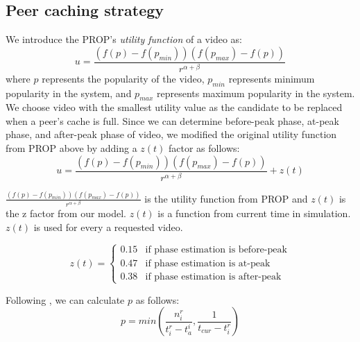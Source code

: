 \documentclass[10pt,final,journal,a4paper]{IEEEtran}
\begin{document}
\subsection{Peer caching strategy}\label{peercachingstrategy}
We introduce the PROP's \textit{utility function} of a video as:
\begin{equation}
u = \frac{ (f(p) - f(p_{min})) (f(p_{max}) - f(p)) }{r^{\alpha + \beta}} 
\end{equation}
where $p$ represents the popularity of the video, $p_{min}$ represents minimum popularity in the system, and $p_{max}$ represents maximum popularity in the system.
We choose video with the smallest utility value as the candidate to be replaced when a peer's cache is full.
Since we can determine before-peak phase, at-peak phase, and after-peak phase of video, we modified the original utility function from PROP above by adding a $z(t)$ factor as follows:
\begin{equation}
u = \frac{ (f(p) - f(p_{min})) (f(p_{max}) - f(p)) }{r^{\alpha + \beta}} + z(t)
\end{equation}

$\frac{ (f(p) - f(p_{min})) (f(p_{max}) - f(p)) }{r^{\alpha + \beta}}$ is the utility function from PROP and $z(t)$ is the z factor from our model.
$z(t)$ is a function from current time in simulation. 
$z(t)$ is used for every a requested video. 


\[
 z(t) =
  \begin{cases}
   0.15 & \text{if phase estimation is before-peak} \\
   0.47 & \text{if phase estimation is at-peak} \\
   0.38 & \text{if phase estimation is after-peak}
  \end{cases}
\]

Following \cite{1613869}, we can calculate $p$ as follows:
\begin{equation}
p = min \left(\frac{n_i^r}{t_i^r - t_a^i}  , \frac{1}{t_{cur} - t_i^r}\right)
\end{equation}
\end{document}
